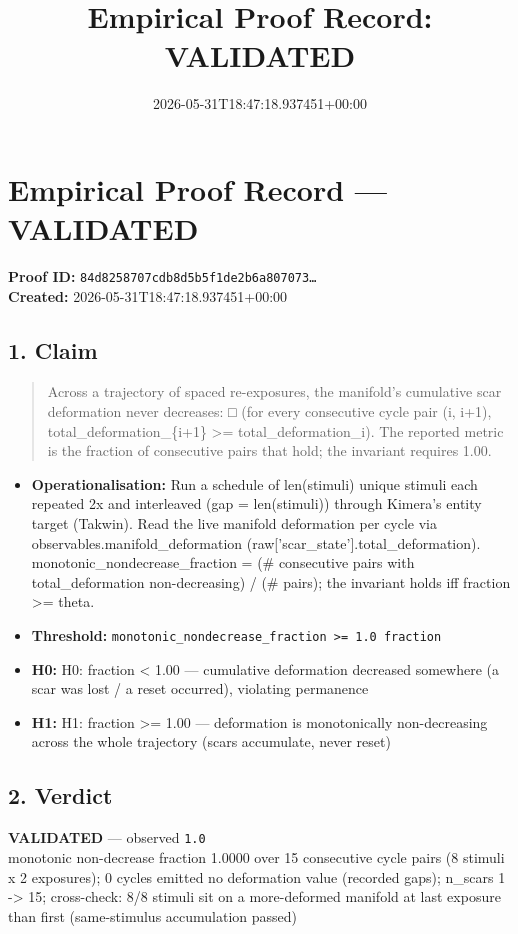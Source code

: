 \documentclass{article}
\title{Empirical Proof Record: VALIDATED}
\date{2026-05-31T18:47:18.937451+00:00}
\begin{document}
\maketitle
\section*{Empirical Proof Record --- \textcolor{validated}{\textbf{VALIDATED}}}
\textbf{Proof ID:} \texttt{84d8258707cdb8d5b5f1de2b6a807073\dots}\\
\textbf{Created:} 2026-05-31T18:47:18.937451+00:00
\subsection*{1. Claim}
\begin{quote}Across a trajectory of spaced re-exposures, the manifold's cumulative scar deformation never decreases: □ (for every consecutive cycle pair (i, i+1), total\_deformation\_\{i+1\} >= total\_deformation\_i). The reported metric is the fraction of consecutive pairs that hold; the invariant requires 1.00.\end{quote}
\begin{itemize}
\item \textbf{Operationalisation:} Run a schedule of len(stimuli) unique stimuli each repeated 2x and interleaved (gap = len(stimuli)) through Kimera's entity target (Takwin). Read the live manifold deformation per cycle via observables.manifold\_deformation (raw['scar\_state'].total\_deformation). monotonic\_nondecrease\_fraction = (\# consecutive pairs with total\_deformation non-decreasing) / (\# pairs); the invariant holds iff fraction >= theta.
\item \textbf{Threshold:} \texttt{monotonic\_nondecrease\_fraction >= 1.0 fraction}
\item \textbf{H0:} H0: fraction < 1.00 — cumulative deformation decreased somewhere (a scar was lost / a reset occurred), violating permanence
\item \textbf{H1:} H1: fraction >= 1.00 — deformation is monotonically non-decreasing across the whole trajectory (scars accumulate, never reset)
\end{itemize}
\subsection*{2. Verdict}
\textcolor{validated}{\textbf{VALIDATED}} --- observed \texttt{1.0}\\
monotonic non-decrease fraction 1.0000 over 15 consecutive cycle pairs (8 stimuli x 2 exposures); 0 cycles emitted no deformation value (recorded gaps); n\_scars 1 -> 15; cross-check: 8/8 stimuli sit on a more-deformed manifold at last exposure than first (same-stimulus accumulation passed)
\end{document}
